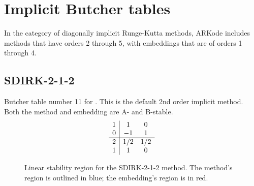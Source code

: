 \documentclass[letterpaper,10pt,english]{sphinxmanual}
\begin{document}
\section{Implicit Butcher tables}
\label{Butcher:implicit-butcher-tables}\label{Butcher:butcher-implicit}
In the category of diagonally implicit Runge-Kutta methods, ARKode
includes methods that have orders 2 through 5, with embeddings that are of
orders 1 through 4.


\subsection{SDIRK-2-1-2}
\label{Butcher:sdirk-2-1-2}\label{Butcher:butcher-sdirk-2-1}
Butcher table number 11
for {\hyperref[c_interface/User_callable:c.ARKodeSetIRKTableNum]{\emph{}}}.  This is
the default 2nd order implicit method.  Both the method and embedding
are A- and B-stable.
\begin{gather}
\begin{split}\begin{array}{r|cc}
  1 & 1 & 0 \\
  0 & -1 & 1 \\
  \hline
  2 & 1/2 & 1/2 \\
  1 & 1 & 0
\end{array}\end{split}\notag
\end{gather}\begin{figure}[htbp]
\centering
\capstart

\caption{Linear stability region for the SDIRK-2-1-2 method.  The method's
region is outlined in blue; the embedding's region is in red.}\end{figure}
\end{document}
